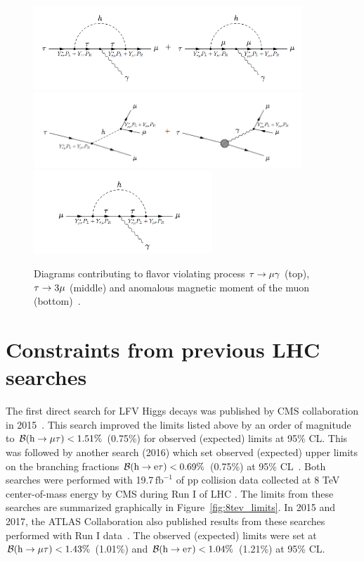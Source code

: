 \begin{figure}[hbtp]
 \begin{center}
   \includegraphics[width=0.9\textwidth]{plots_and_figures/chapter2/tau_mugamma.png}\\
   \includegraphics[width=0.9\textwidth]{plots_and_figures/chapter2/tau_3mu.png}\\
   \includegraphics[width=0.6\textwidth]{plots_and_figures/chapter2/dipole.png}
   \caption{Diagrams contributing to flavor violating process $\tau\rightarrow\mu\gamma$ (top), $\tau\rightarrow 3\mu$ (middle) and anomalous magnetic moment of the muon (bottom)~\cite{Harnik:2012pb}.}
   \label{fig:prelhclfv}
 \end{center}
\end{figure}

\section{Constraints from previous LHC searches}

The first direct search for LFV Higgs decays was published by CMS collaboration in 2015~\cite{Khachatryan:2015kon}. This search improved the limits listed above by an order of magnitude to $\mathcal{B}(\text{h} \to \mu \tau)<1.51\%$ (0.75\%) for observed (expected) limits at 95\% CL. This was followed by another search (2016) which set observed (expected) upper limits on the branching fractions  $\mathcal{B}(\text{h} \to \text{e} \tau)<0.69\%$ (0.75\%) at 95\% CL~\cite{HIG-14-040}. Both searches were performed with 19.7\,$\mathrm{fb}^{-1}$ of pp collision data collected at 8 TeV center-of-mass energy by CMS during Run I of LHC . The limits from these searches are summarized graphically in Figure~\ref{fig:8tev_limits}. In 2015 and 2017, the ATLAS Collaboration also published results from these searches performed with Run I data~\cite{Aad:2016blu,Aad:2015gha}. The observed (expected) limits were set at $\mathcal{B}(\text{h} \to \mu \tau)<1.43\%$ (1.01\%) and $\mathcal{B}(\text{h} \to \text{e} \tau)<1.04\%$ (1.21\%) at 95\% CL.

